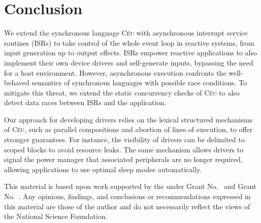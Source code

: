 \documentclass[sigplan,10pt,review,anonymous]{acmart}\settopmatter{printfolios=true,printccs=false,printacmref=false}
\newcommand{\CEU}{\textsc{C\'{e}u}\xspace}
\begin{document}
\section{Conclusion}

We extend the synchronous language \CEU with asynchronous interrupt service
routines (ISRs) to take control of the whole event loop in reactive systems,
from input generation up to output effects.
%
ISRs empower reactive applications to also implement their own device drivers
and self-generate inputs, bypassing the need for a host environment.
%
However, asynchronous execution confronts the well-behaved semantics of
synchronous languages with possible race conditions.
%
To mitigate this threat, we extend the static concurrency checks of \CEU to also
detect data races between ISRs and the application.

Our approach for developing drivers relies on the lexical structured mechanisms of
\CEU, such as parallel compositions and abortion of lines of execution, to
offer stronger guarantees.
%
For instance, the visibility of drivers can be delimited to scoped blocks to
avoid resource leaks.
%
The same mechanism allows drivers to signal the power manager that associated
peripherals are no longer required, allowing applications to use optimal
sleep modes automatically.

\begin{acks}                            %
  This material is based upon work supported by the
   under Grant
  No.~ and Grant
  No.~.  Any opinions, findings, and
  conclusions or recommendations expressed in this material are those
  of the author and do not necessarily reflect the views of the
  National Science Foundation.
\end{acks}


\end{document}
